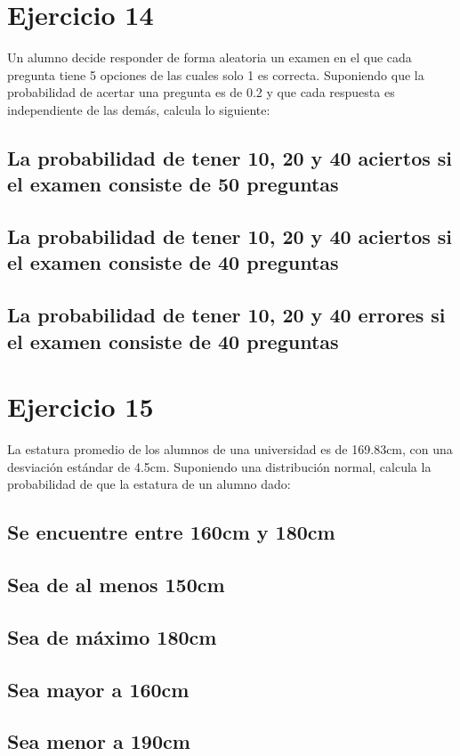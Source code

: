 \documentclass[12pt]{article}
\begin{document}
\section{Ejercicio 14}
 Un alumno decide responder de forma aleatoria un examen en el que cada pregunta tiene
5 opciones de las cuales solo 1 es correcta. Suponiendo que la probabilidad de acertar una
pregunta es de 0.2 y que cada respuesta es independiente de las demás, calcula lo siguiente:\\
\subsection{La probabilidad de tener 10, 20 y 40 aciertos si el examen consiste de 50 preguntas}
\subsection{La probabilidad de tener 10, 20 y 40 aciertos si el examen consiste de 40 preguntas}
\subsection{La probabilidad de tener 10, 20 y 40 errores si el examen consiste de 40 preguntas}
\section{Ejercicio 15}
La estatura promedio de los alumnos de una universidad es de 169.83cm, con una desviación
estándar de 4.5cm. Suponiendo una distribución normal, calcula la probabilidad de que la
estatura de un alumno dado:
\subsection{Se encuentre entre 160cm y 180cm}
\subsection{Sea de al menos 150cm}
\subsection{Sea de máximo 180cm}
\subsection{Sea mayor a 160cm}
\subsection{Sea menor a 190cm}
\end{document}
